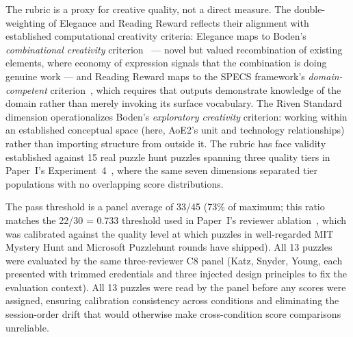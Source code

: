 The rubric is a proxy for creative quality, not a direct measure. The double-weighting of Elegance and Reading Reward reflects their alignment with established computational creativity criteria: Elegance maps to Boden's \emph{combinational creativity} criterion~\cite{boden2004creative} --- novel but valued recombination of existing elements, where economy of expression signals that the combination is doing genuine work --- and Reading Reward maps to the SPECS framework's \emph{domain-competent} criterion~\cite{jordanous2012standardised}, which requires that outputs demonstrate knowledge of the domain rather than merely invoking its surface vocabulary. The Riven Standard dimension operationalizes Boden's \emph{exploratory creativity} criterion: working within an established conceptual space (here, AoE2's unit and technology relationships) rather than importing structure from outside it. The rubric has face validity established against 15 real puzzle hunt puzzles spanning three quality tiers in Paper~I's Experiment~4~\cite{paper1}, where the same seven dimensions separated tier populations with no overlapping score distributions.

The pass threshold is a panel average of 33/45 (73\% of maximum; this ratio matches the 22/30 = 0.733 threshold used in Paper~I's reviewer ablation~\cite{paper1}, which was calibrated against the quality level at which puzzles in well-regarded MIT Mystery Hunt and Microsoft Puzzlehunt rounds have shipped). All 13 puzzles were evaluated by the same three-reviewer C8 panel (Katz, Snyder, Young, each presented with trimmed credentials and three injected design principles to fix the evaluation context). All 13 puzzles were read by the panel before any scores were assigned, ensuring calibration consistency across conditions and eliminating the session-order drift that would otherwise make cross-condition score comparisons unreliable.
